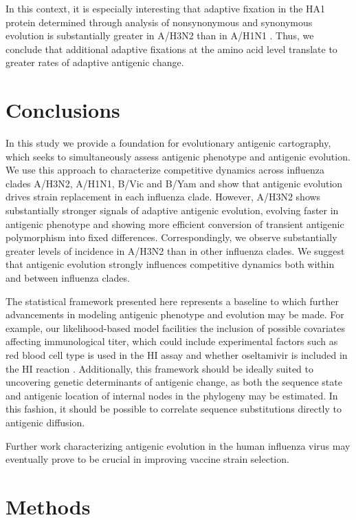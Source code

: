 \documentclass[11pt,oneside,letterpaper]{article}
\begin{document}
In this context, it is especially interesting that adaptive fixation in the HA1 protein determined through analysis of nonsynonymous and synonymous evolution is substantially greater in A/H3N2 than in A/H1N1 \cite{Wolf06, Bhatt11}.
Thus, we conclude that additional adaptive fixations at the amino acid level translate to greater rates of adaptive antigenic change. 

\section*{Conclusions}

In this study we provide a foundation for evolutionary antigenic cartography, which seeks to simultaneously assess antigenic phenotype and antigenic evolution.
We use this approach to characterize competitive dynamics across influenza clades A/H3N2, A/H1N1, B/Vic and B/Yam and show that antigenic evolution drives strain replacement in each influenza clade.
However, A/H3N2 shows substantially stronger signals of adaptive antigenic evolution, evolving faster in antigenic phenotype and showing more efficient conversion of transient antigenic polymorphism into fixed differences.
Correspondingly, we observe substantially greater levels of incidence in A/H3N2 than in other influenza clades.
We suggest that antigenic evolution strongly influences competitive dynamics both within and between influenza clades.

The statistical framework presented here represents a baseline to which further advancements in modeling antigenic phenotype and evolution may be made.
For example, our likelihood-based model facilities the inclusion of possible covariates affecting immunological titer, which could include experimental factors such as red blood cell type is used in the HI assay \cite{Lin12} and whether oseltamivir is included in the HI reaction \cite{Lin10}.
Additionally, this framework should be ideally suited to uncovering genetic determinants of antigenic change, as both the sequence state and antigenic location of internal nodes in the phylogeny may be estimated.
In this fashion, it should be possible to correlate sequence substitutions directly to antigenic diffusion.

Further work characterizing antigenic evolution in the human influenza virus may eventually prove to be crucial in improving vaccine strain selection.

\section*{Methods}
\end{document}
